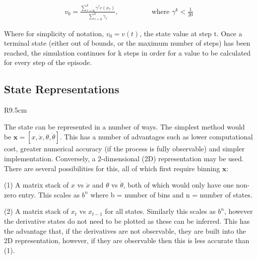 \documentclass[../main.tex]{subfiles}
\begin{document}
\begin{align}
   \label{equ:value}
   v_0 = \frac{\sum_{\tau=0}^{k} \gamma^\tau c(x_\tau ) }{\sum_{\tau = 0}^k \gamma_\tau}, \hspace{2cm} \text{where } \gamma^k < \frac{1}{20}
\end{align}

Where for simplicity of notation, $v_0 = v(t)$, the state value at step t. Once a terminal state (either out of bounds, or the maximum number of steps) has been reached, the simulation continues for k steps in order for a value to be calculated for every step of the episode.

\newpage
\subsection{State Representations}

\begin{wrapfigure}{R}{9.5cm}
\end{wrapfigure}

The state can be represented in a number of ways. The simplest method would be $\boldsymbol{x} = [x, \dot{x}, \theta, \dot{\theta}]$. This has a number of advantages such as lower computational cost, greater numerical accuracy (if the process is fully observable) and simpler implementation. Conversely, a 2-dimensional (2D) representation may be used. There are several possibilities for this, all of which first require binning $\boldsymbol{x}$:

(1) A matrix stack of $x$ vs $\dot{x}$ and $\theta$ vs $\dot{\theta}$, both of which would only have one non-zero entry. This scales as $b^n$ where b = number of bins and n = number of states.

(2) A matrix stack of $x_t$ vs $x_{t-1}$ for all states. Similarly this scales as $b^n$, however the derivative states do not need to be plotted as these can be inferred. This has the advantage that, if the derivatives are not observable, they are built into the 2D representation, however, if they are observable then this is less accurate than (1).
\end{document}
